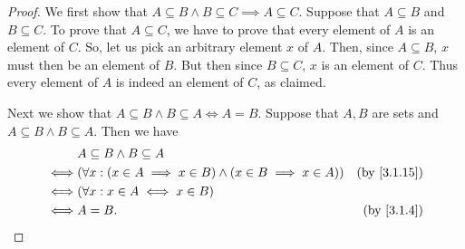 \begin{proof}
  We first show that \(A \subseteq B \land B \subseteq C \implies A \subseteq C\).
  Suppose that \(A \subseteq B\) and \(B \subseteq C\).
  To prove that \(A \subseteq C\), we have to prove that every element of \(A\) is an element of \(C\).
  So, let us pick an arbitrary element \(x\) of \(A\).
  Then, since \(A \subseteq B\), \(x\) must then be an element of \(B\).
  But then since \(B \subseteq C\), \(x\) is an element of \(C\).
  Thus every element of \(A\) is indeed an element of \(C\), as claimed.

  Next we show that \(A \subseteq B \land B \subseteq A \iff A = B\).
  Suppose that \(A, B\) are sets and \(A \subseteq B \land B \subseteq A\).
  Then we have
  \begin{align*}
         & A \subseteq B \land B \subseteq A                                                                     \\
    \iff & (\forall x : (x \in A \implies x \in B) \land (x \in B \implies x \in A)) & \text{(by \cref{3.1.15})} \\
    \iff & (\forall x : x \in A \iff x \in B)                                                                    \\
    \iff & A = B.                                                                    & \text{(by \cref{3.1.4})}
  \end{align*}


\end{proof}
